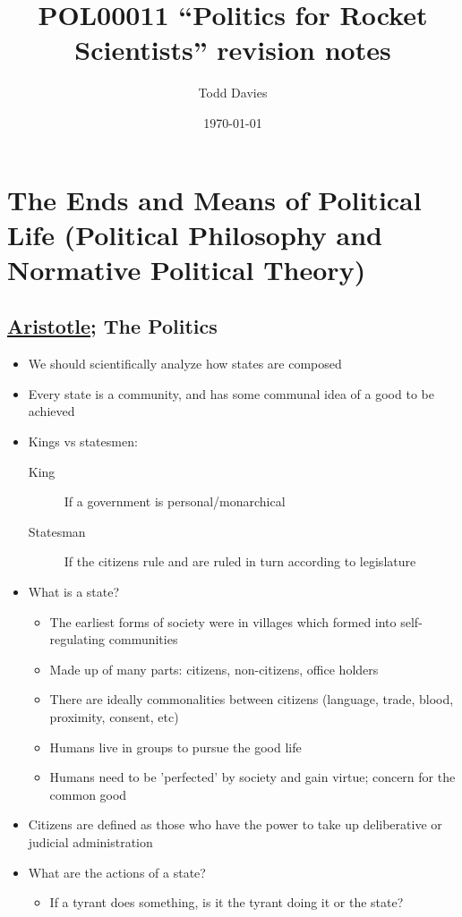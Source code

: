 \documentclass[11pt]{article}
\author{Todd Davies}
\date{\today}
\title{POL00011 ``Politics for Rocket Scientists'' revision notes}
\begin{document}
\maketitle
\tableofcontents


\section{The Ends and Means of Political Life (Political Philosophy and Normative Political Theory)}
\label{sec:org4b3238d}
\subsection{\href{Aristotle.org}{Aristotle}; The Politics}
\label{sec:orgd9d669a}
\begin{itemize}
\item We should scientifically analyze how states are composed
\item Every state is a community, and has some communal idea of a good to be achieved
\item Kings vs statesmen:
\begin{description}
\item[{King}] If a government is personal/monarchical
\item[{Statesman}] If the citizens rule and are ruled in turn according to legislature
\end{description}
\item What is a state?
\begin{itemize}
\item The earliest forms of society were in villages which formed into
self-regulating communities
\item Made up of many parts: citizens, non-citizens, office holders
\item There are ideally commonalities between citizens (language, trade, blood,
proximity, consent, etc)
\item Humans live in groups to pursue the good life
\item Humans need to be 'perfected' by society and gain virtue; concern for the
common good
\end{itemize}
\item Citizens are defined as those who have the power to take up deliberative or
judicial administration
\item What are the actions of a state?
\begin{itemize}
\item If a tyrant does something, is it the tyrant doing it or the state?

\end{itemize}
\end{itemize}
\end{document}
